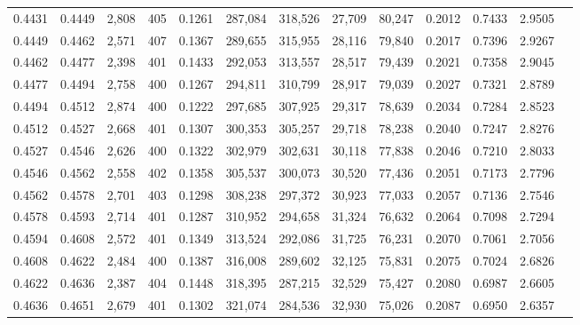 \begin{tabular}{rrrrrrrrrrrrr}
0.4431 & 0.4449 &  2,808 & 405 &                                     0.1261 & 287,084 & 318,526 &  27,709 &  80,247 & 0.2012 & 0.7433 & 2.9505 \\
0.4449 & 0.4462 &  2,571 & 407 &                                     0.1367 & 289,655 & 315,955 &  28,116 &  79,840 & 0.2017 & 0.7396 & 2.9267 \\
0.4462 & 0.4477 &  2,398 & 401 &                                     0.1433 & 292,053 & 313,557 &  28,517 &  79,439 & 0.2021 & 0.7358 & 2.9045 \\
0.4477 & 0.4494 &  2,758 & 400 &                                     0.1267 & 294,811 & 310,799 &  28,917 &  79,039 & 0.2027 & 0.7321 & 2.8789 \\
0.4494 & 0.4512 &  2,874 & 400 &                                     0.1222 & 297,685 & 307,925 &  29,317 &  78,639 & 0.2034 & 0.7284 & 2.8523 \\
0.4512 & 0.4527 &  2,668 & 401 &                                     0.1307 & 300,353 & 305,257 &  29,718 &  78,238 & 0.2040 & 0.7247 & 2.8276 \\
0.4527 & 0.4546 &  2,626 & 400 &                                     0.1322 & 302,979 & 302,631 &  30,118 &  77,838 & 0.2046 & 0.7210 & 2.8033 \\
0.4546 & 0.4562 &  2,558 & 402 &                                     0.1358 & 305,537 & 300,073 &  30,520 &  77,436 & 0.2051 & 0.7173 & 2.7796 \\
0.4562 & 0.4578 &  2,701 & 403 &                                     0.1298 & 308,238 & 297,372 &  30,923 &  77,033 & 0.2057 & 0.7136 & 2.7546 \\
0.4578 & 0.4593 &  2,714 & 401 &                                     0.1287 & 310,952 & 294,658 &  31,324 &  76,632 & 0.2064 & 0.7098 & 2.7294 \\
0.4594 & 0.4608 &  2,572 & 401 &                                     0.1349 & 313,524 & 292,086 &  31,725 &  76,231 & 0.2070 & 0.7061 & 2.7056 \\
0.4608 & 0.4622 &  2,484 & 400 &                                     0.1387 & 316,008 & 289,602 &  32,125 &  75,831 & 0.2075 & 0.7024 & 2.6826 \\
0.4622 & 0.4636 &  2,387 & 404 &                                     0.1448 & 318,395 & 287,215 &  32,529 &  75,427 & 0.2080 & 0.6987 & 2.6605 \\
0.4636 & 0.4651 &  2,679 & 401 &                                     0.1302 & 321,074 & 284,536 &  32,930 &  75,026 & 0.2087 & 0.6950 & 2.6357 \\

\end{tabular}
